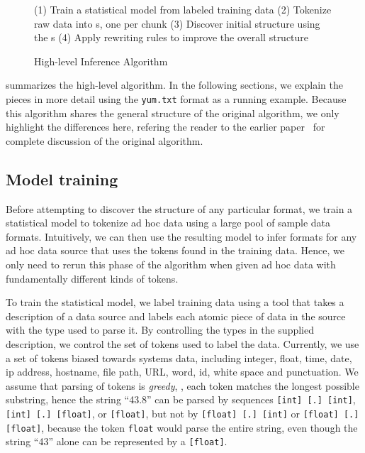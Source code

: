 \begin{figure}[t]
\begin{centercode}
(1) Train a statistical model from labeled training data
(2) Tokenize raw data into \seqset{}s, one \seqset{} per chunk
(3) Discover initial structure using the \seqset{}s
(4) Apply rewriting rules to improve the overall structure
\end{centercode}
\caption{High-level Inference Algorithm}\label{fig:algo}
\end{figure}

 summarizes the high-level algorithm.  In the
following sections, we explain the pieces in more detail using the
\texttt{yum.txt} format as a running example.
Because this algorithm shares the general structure of
the original algorithm, we only highlight the differences here, 
refering the reader to the earlier paper~\cite{fisher+:dirttoshovels}
for complete discussion of the original algorithm.

\subsection{Model training}

Before attempting to discover the structure of any particular format,
we train a statistical model to tokenize ad hoc data using a large
pool of sample data formats.  Intuitively, we can then use the
resulting model to infer formats for any ad hoc data source that uses
the tokens found in the training data.  Hence, we only need to
rerun this phase of the algorithm when given ad hoc data with
fundamentally different kinds of tokens.  

To train the statistical model, we label training data using a \pads{}
tool that takes a \pads{} description of a data source and labels each
atomic piece of data in the source with the \pads{} type used to parse
it.  By controlling the types in the supplied \pads{} description, we
control the set of tokens used to label the data.   Currently, we use
a set of tokens biased towards systems data, including
integer, float, time, date, ip address, hostname, file path, URL, 
word, id, white space and punctuation. 
We assume that parsing of tokens is {\em greedy}, \ie{},
each token matches the longest possible substring, hence
the string ``43.8'' can be parsed by sequences 
{\tt [int] [.] [int]}, {\tt [int] [.] [float]}, or {\tt [float]},
but not by {\tt [float] [.] [int]} or {\tt [float] [.] [float]},
because the token {\tt float} would parse the entire string, even though
the string ``43'' alone can be represented by a {\tt [float]}.

